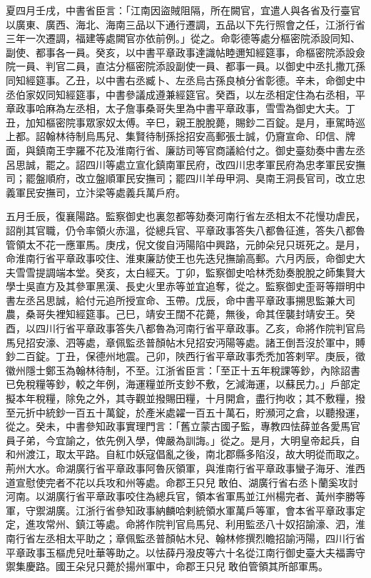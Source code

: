 \begin{pinyinscope}
 夏四月壬戌，中書省臣言：「江南因盜賊阻隔，所在闕官，宜遣人與各省及行臺官以廣東、廣西、海北、海南三品以下通行遷調，五品以下先行照會之任，江浙行省三年一次遷調，福建等處闕官亦依前例。」從之。命彰德等處分樞密院添設同知、副使、都事各一員。癸亥，以中書平章政事達識帖睦邇知經筵事，命樞密院添設僉院一員、判官二員，直沽分樞密院添設副使一員、都事一員。以御史中丞扎撒兀孫同知經筵事。乙丑，以中書右丞臧卜、左丞烏古孫良楨分省彰德。辛未，命御史中丞伯家奴同知經筵事，中書參議成遵兼經筵官。癸酉，以左丞相定住為右丞相，平章政事哈麻為左丞相，太子詹事桑哥失里為中書平章政事，雪雪為御史大夫。丁丑，加知樞密院事眾家奴太傅。辛巳，親王脫脫薨，賜鈔二百錠。是月，車駕時巡上都。詔翰林待制烏馬兒、集賢待制孫捴招安高郵張士誠，仍齎宣命、印信、牌面，與鎮南王孛羅不花及淮南行省、廉訪司等官商議給付之。御史臺劾奏中書左丞呂思誠，罷之。詔四川等處立宣化鎮南軍民府，改四川忠孝軍民府為忠孝軍民安撫司；罷盤順府，改立盤順軍民安撫司；罷四川羊毋甲洞、臭南王洞長官司，改立忠義軍民安撫司，立汴梁等處義兵萬戶府。



 五月壬辰，復襄陽路。監察御史也裏忽都等劾奏河南行省左丞相太不花慢功虐民，詔削其官職，仍令率領火赤溫，從總兵官、平章政事答失八都魯征進，答失八都魯管領太不花一應軍馬。庚戌，倪文俊自沔陽陷中興路，元帥朵兒只斑死之。是月，命淮南行省平章政事咬住、淮東廉訪使王也先迭兒撫諭高郵。六月丙辰，命御史大夫雪雪提調端本堂。癸亥，太白經天。丁卯，監察御史哈林禿劾奏脫脫之師集賢大學士吳直方及其參軍黑漢、長史火里赤等並宜追奪，從之。監察御史歪哥等辯明中書左丞呂思誠，給付元追所授宣命、玉帶。戊辰，命中書平章政事搠思監兼大司農，桑哥失裡知經筵事。己巳，靖安王闊不花薨，無後，命其侄襲封靖安王。癸酉，以四川行省平章政事答失八都魯為河南行省平章政事。乙亥，命將作院判官烏馬兒招安濠、泗等處，章佩監丞普顏帖木兒招安沔陽等處。諸王倒吾沒於軍中，賻鈔二百錠。丁丑，保德州地震。己卯，陜西行省平章政事禿禿加答剌罕。庚辰，徵徽州隱士鄭玉為翰林待制，不至。江浙省臣言：「至正十五年稅課等鈔，內除詔書已免稅糧等鈔，較之年例，海運糧並所支鈔不敷，乞減海運，以蘇民力。」戶部定擬本年稅糧，除免之外，其寺觀並撥賜田糧，十月開倉，盡行拘收；其不敷糧，撥至元折中統鈔一百五十萬錠，於產米處糴一百五十萬石，貯瀕河之倉，以聽撥運，從之。癸未，中書參知政事實理門言：「舊立蒙古國子監，專教四怯薛並各愛馬官員子弟，今宜諭之，依先例入學，俾嚴為訓誨。」從之。是月，大明皇帝起兵，自和州渡江，取太平路。自紅巾妖寇倡亂之後，南北郡縣多陷沒，故大明從而取之。荊州大水。命湖廣行省平章政事阿魯灰領軍，與淮南行省平章政事蠻子海牙、淮西道宣慰使完者不花以兵攻和州等處。命郡王只兒敢伯、湖廣行省右丞卜蘭奚攻討河南。以湖廣行省平章政事咬住為總兵官，領本省軍馬並江州楊完者、黃州李勝等軍，守禦湖廣。江浙行省參知政事納麟哈剌統領水軍萬戶等軍，會本省平章政事定定，進攻常州、鎮江等處。命將作院判官烏馬兒、利用監丞八十奴招諭濠、泗，淮南行省左丞相太平助之；章佩監丞普顏帖木兒、翰林修撰烈瞻招諭沔陽，四川行省平章政事玉樞虎兒吐華等助之。以怯薛丹潑皮等六十名從江南行御史臺大夫福壽守禦集慶路。國王朵兒只薨於揚州軍中，命郡王只兒敢伯管領其所部軍馬。




\end{pinyinscope}
